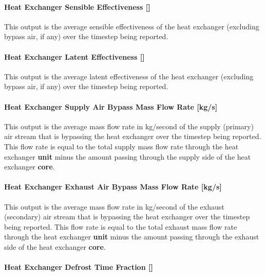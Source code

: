 \paragraph{Heat Exchanger Sensible Effectiveness {[]}}\label{heat-exchanger-sensible-effectiveness}

This output is the average sensible effectiveness of the heat exchanger (excluding bypass air, if any) over the timestep being reported.

\paragraph{Heat Exchanger Latent Effectiveness {[]}}\label{heat-exchanger-latent-effectiveness}

This output is the average latent effectiveness of the heat exchanger (excluding bypass air, if any) over the timestep being reported.

\paragraph{Heat Exchanger Supply Air Bypass Mass Flow Rate {[}kg/s{]}}\label{heat-exchanger-supply-air-bypass-mass-flow-rate-kgs}

This output is the average mass flow rate in kg/second of the supply (primary) air stream that is bypassing the heat exchanger over the timestep being reported. This flow rate is equal to the total supply mass flow rate through the heat exchanger \textbf{unit} minus the amount passing through the supply side of the heat exchanger \textbf{core}.

\paragraph{Heat Exchanger Exhaust Air Bypass Mass Flow Rate {[}kg/s{]}}\label{heat-exchanger-exhaust-air-bypass-mass-flow-rate-kgs}

This output is the average mass flow rate in kg/second of the exhaust (secondary) air stream that is bypassing the heat exchanger over the timestep being reported. This flow rate is equal to the total exhaust mass flow rate through the heat exchanger \textbf{unit} minus the amount passing through the exhaust side of the heat exchanger \textbf{core}.

\paragraph{Heat Exchanger Defrost Time Fraction {[]}}\label{heat-exchanger-defrost-time-fraction}

